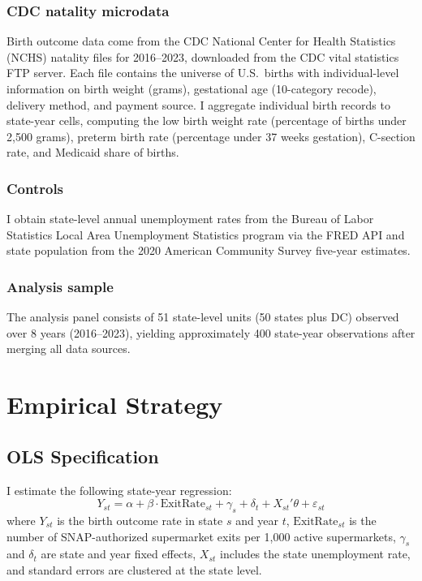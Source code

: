 \documentclass[12pt]{article}
\begin{document}
\subsubsection*{CDC natality microdata} Birth outcome data come from the CDC National Center for Health Statistics (NCHS) natality files for 2016--2023, downloaded from the CDC vital statistics FTP server. Each file contains the universe of U.S.\ births with individual-level information on birth weight (grams), gestational age (10-category recode), delivery method, and payment source. I aggregate individual birth records to state-year cells, computing the low birth weight rate (percentage of births under 2,500 grams), preterm birth rate (percentage under 37 weeks gestation), C-section rate, and Medicaid share of births.

\subsubsection*{Controls} I obtain state-level annual unemployment rates from the Bureau of Labor Statistics Local Area Unemployment Statistics program via the FRED API and state population from the 2020 American Community Survey five-year estimates.

\subsubsection*{Analysis sample} The analysis panel consists of 51 state-level units (50 states plus DC) observed over 8 years (2016--2023), yielding approximately 400 state-year observations after merging all data sources.



\section{Empirical Strategy}
\label{sec:strategy}

\subsection{OLS Specification}

I estimate the following state-year regression:
\begin{equation}
Y_{st} = \alpha + \beta \cdot \text{ExitRate}_{st} + \gamma_s + \delta_t + X_{st}'\theta + \varepsilon_{st}
\label{eq:ols}
\end{equation}
where $Y_{st}$ is the birth outcome rate in state $s$ and year $t$, $\text{ExitRate}_{st}$ is the number of SNAP-authorized supermarket exits per 1,000 active supermarkets, $\gamma_s$ and $\delta_t$ are state and year fixed effects, $X_{st}$ includes the state unemployment rate, and standard errors are clustered at the state level.
\end{document}
